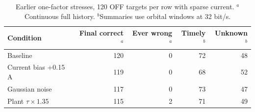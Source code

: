 \begin{table}[!htb]\centering\small
\caption{Earlier one-factor stresses, 120 OFF targets per row with sparse current. $^a$Continuous full history. $^b$Summaries use orbital windows at 32 bit/s.}\label{tab:stress}
\begin{tabular}{@{}lrrrr@{}}\toprule
Condition & Final correct$^a$ & Ever wrong$^a$ & Timely$^b$ & Unknown$^b$\\\midrule
Baseline & 120 & 0 & 72 & 48\\
Current bias +0.15 A & 119 & 0 & 68 & 52\\
Gaussian noise & 117 & 0 & 73 & 47\\
Plant $\tau\times1.35$ & 115 & 2 & 71 & 49\\
\bottomrule\end{tabular}\end{table}
